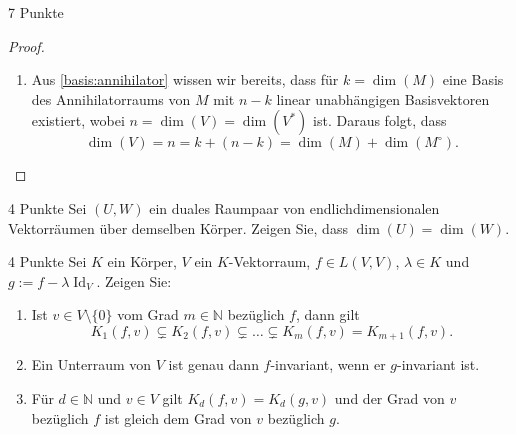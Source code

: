 \documentclass{problemset}
\begin{document}
\begin{problem}{7 Punkte}
\begin{proof}
\begin{enumerate}
        \item Aus \autoref{basis:annihilator} wissen wir bereits, dass für \(k = \dim(M)\)
              eine Basis des Annihilatorraums von \(M\) mit \(n - k\) linear unabhängigen
              Basisvektoren existiert, wobei \(n = \dim(V) = \dim(V^*)\) ist. Daraus folgt,
              dass
              \begin{equation*}
                  \dim(V) = n = k + (n - k) = \dim(M) + \dim(M^\circ).
              \end{equation*}
    \end{enumerate}
\end{proof}
\end{problem}

\begin{problem}{4 Punkte}
Sei $(U, W)$ ein duales Raumpaar von endlichdimensionalen Vektorräumen über
demselben Körper. Zeigen Sie, dass $\dim(U) = \dim(W)$.
\end{problem}

\begin{problem}[\textit{[LM21, Aufgaben 16.1, 16.3, 16.4]}]{4 Punkte}
Sei $K$ ein Körper, $V$ ein $K$-Vektorraum, $f \in L(V, V)$, $\lambda \in K$
und $g := f - \lambda \operatorname{Id}_V$. Zeigen Sie:
\begin{enumerate}
    \item Ist $v \in V \setminus \{0\}$ vom Grad $m \in \mathbb{N}$ bezüglich $f$, dann
          gilt
          \[
              K_1(f, v) \subsetneq K_2(f, v) \subsetneq \ldots \subsetneq K_m(f, v) = K_{m+1}(f, v).
          \]
    \item Ein Unterraum von $V$ ist genau dann $f$-invariant, wenn er $g$-invariant ist.
    \item Für $d \in \mathbb{N}$ und $v \in V$ gilt $K_d(f, v) = K_d(g, v)$ und der Grad
          von $v$ bezüglich $f$ ist gleich dem Grad von $v$ bezüglich $g$.
\end{enumerate}
\end{problem}
\end{document}

